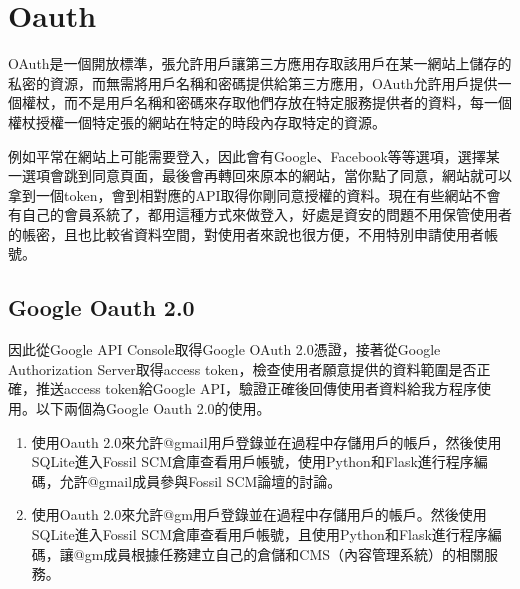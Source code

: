 \chapter{Oauth}
\renewcommand{\baselinestretch}{10} %
\par
\renewcommand{\baselinestretch}{1} %
\twelve \qquad OAuth是一個開放標準，張允許用戶讓第三方應用存取該用戶在某一網站上儲存的私密的資源，而無需將用戶名稱和密碼提供給第三方應用，OAuth允許用戶提供一個權杖，而不是用戶名稱和密碼來存取他們存放在特定服務提供者的資料，每一個權杖授權一個特定張的網站在特定的時段內存取特定的資源。\\
\par
\twelve \hspace{0.5em} 例如平常在網站上可能需要登入，因此會有Google、Facebook等等選項，選擇某一選項會跳到同意頁面，最後會再轉回來原本的網站，當你點了同意，網站就可以拿到一個token，會到相對應的API取得你剛同意授權的資料。現在有些網站不會有自己的會員系統了，都用這種方式來做登入，好處是資安的問題不用保管使用者的帳密，且也比較省資料空間，對使用者來說也很方便，不用特別申請使用者帳號。

\renewcommand{\baselinestretch}{20} %
\section{Google Oauth 2.0}
\par
\renewcommand{\baselinestretch}{1} %
\twelve \qquad 因此從Google API Console取得Google OAuth 2.0憑證，接著從Google Authorization Server取得access token，檢查使用者願意提供的資料範圍是否正確，推送access token給Google API，驗證正確後回傳使用者資料給我方程序使用。以下兩個為Google Oauth 2.0的使用。
\begin{enumerate}
\item 使用Oauth 2.0來允許@gmail用戶登錄並在過程中存儲用戶的帳戶，然後使用SQLite進入Fossil SCM倉庫查看用戶帳號，使用Python和Flask進行程序編碼，允許@gmail成員參與Fossil SCM論壇的討論。
\item 使用Oauth 2.0來允許@gm用戶登錄並在過程中存儲用戶的帳戶。然後使用SQLite進入Fossil SCM倉庫查看用戶帳號，且使用Python和Flask進行程序編碼，讓@gm成員根據任務建立自己的倉儲和CMS（內容管理系統）的相關服務。
\end{enumerate}
\par